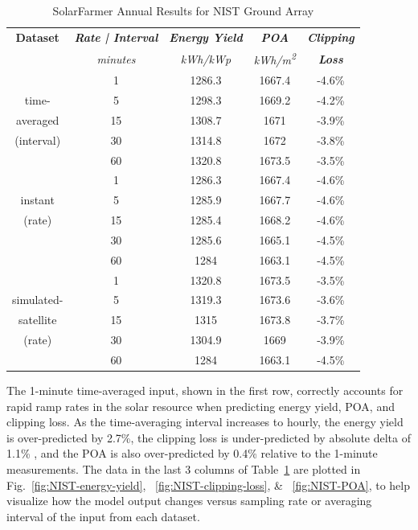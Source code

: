 \documentclass[conference]{IEEEtran}
\begin{document}
\begin{table}[htbp]
\caption{SolarFarmer Annual Results for NIST Ground Array}
\begin{center}
\begin{tabular}{|c|c|c|c|c|}
\hline
\textbf{Dataset} & \textbf{\textit{Rate | Interval}} & \textbf{\textit{Energy Yield}} & \textbf{\textit{POA}} & \textbf{\textit{Clipping}} \\
& \textit{minutes} & \textit{kWh/kWp} & \textit{kWh/m\textsuperscript{2}} & \textbf{\textit{Loss}} \\
\hline
             &  1& 1286.3& 1667.4& -4.6\% \\
time-        &  5& 1298.3& 1669.2& -4.2\% \\
averaged     & 15& 1308.7& 1671  & -3.9\% \\
(interval)   & 30& 1314.8& 1672  & -3.8\% \\
             & 60& 1320.8& 1673.5& -3.5\% \\
\hline
             &  1& 1286.3& 1667.4& -4.6\% \\
instant      &  5& 1285.9& 1667.7& -4.6\% \\
(rate)       & 15& 1285.4& 1668.2& -4.6\% \\
             & 30& 1285.6& 1665.1& -4.5\% \\
             & 60& 1284  & 1663.1& -4.5\% \\
\hline
             &  1& 1320.8& 1673.5& -3.5\% \\
simulated-   &  5& 1319.3& 1673.6& -3.6\% \\
satellite    & 15& 1315  & 1673.8& -3.7\% \\
(rate)       & 30& 1304.9& 1669  & -3.9\% \\
             & 60& 1284  & 1663.1& -4.5\% \\
\hline
\end{tabular}
\label{table:results-summary}
\end{center}
\end{table}

The 1-minute time-averaged input, shown in the first row, correctly accounts for rapid ramp rates in the solar resource when predicting energy yield, POA, and clipping loss. As the time-averaging interval increases to hourly, the energy yield is over-predicted by 2.7\%, the clipping loss is under-predicted by absolute delta of 1.1\% , and the POA is also over-predicted by 0.4\% relative to the 1-minute measurements. The data in the last 3 columns of Table~\ref{table:results-summary} are plotted in Fig.~\ref{fig:NIST-energy-yield}, ~\ref{fig:NIST-clipping-loss}, \& ~\ref{fig:NIST-POA}, to help visualize how the model output changes versus sampling rate or averaging interval of the input from each dataset.
\end{document}
